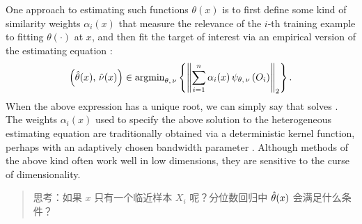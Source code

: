 \documentclass[aos]{imsart}
\theoremstyle{plain}
\theoremstyle{definition}
\theoremstyle{remark}
\begin{document}
\begin{CJK}{UTF8}{gbsn}
One approach to estimating such functions $\theta(x)$ is to first define
some kind of similarity weights $\alpha_i(x)$ that measure the relevance of the $i$-th training example to fitting $\theta(\cdot)$ at $x$, and then fit the target of interest via an empirical version of the estimating equation
\citep{fan1998local,newey1994kernel,staniswalis1989kernel,stone1977consistent,tibshirani1987local}:
\begin{equation}
\label{eq:gee_estimate}
\p{\htheta(x), \, \hnu(x)} \in \argmin_{\theta, \, \nu} \cb{\Norm{\sum_{i = 1}^n \alpha_i(x) \, \psi_{\theta, \, \nu}\p{O_i}}_2}.
\end{equation}
When the above expression has a unique root, we can simply say that  solves . The weights $\alpha_i(x)$ used to specify the above solution to the heterogeneous estimating equation are traditionally obtained via a deterministic kernel function, perhaps with an adaptively chosen bandwidth parameter \citep{hastie2009elements}. Although methods of the above kind often work well in low dimensions, they are sensitive to the curse of dimensionality.


\begin{quote}
    思考：如果 $x$ 只有一个临近样本 $X_i$ 呢？分位数回归中 $\hat{\theta}(x)$ 会满足什么条件？
\end{quote}



\end{CJK}
\end{document}
